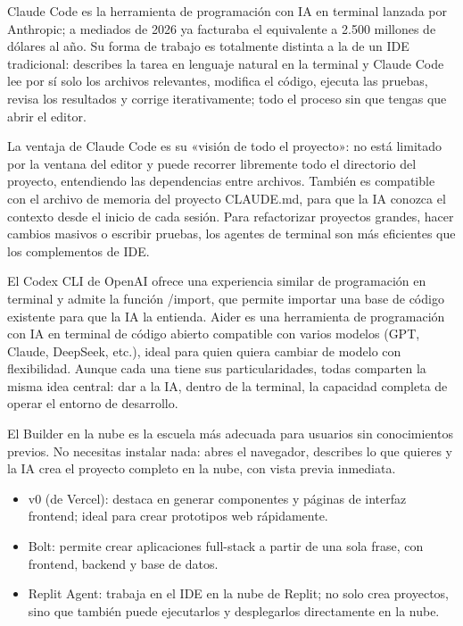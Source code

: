 
Claude Code es la herramienta de programación con IA en terminal lanzada por Anthropic; a mediados de 2026 ya facturaba el equivalente a 2.500 millones de dólares al año. Su forma de trabajo es totalmente distinta a la de un IDE tradicional: describes la tarea en lenguaje natural en la terminal y Claude Code lee por sí solo los archivos relevantes, modifica el código, ejecuta las pruebas, revisa los resultados y corrige iterativamente; todo el proceso sin que tengas que abrir el editor.

La ventaja de Claude Code es su «visión de todo el proyecto»: no está limitado por la ventana del editor y puede recorrer libremente todo el directorio del proyecto, entendiendo las dependencias entre archivos. También es compatible con el archivo de memoria del proyecto CLAUDE.md, para que la IA conozca el contexto desde el inicio de cada sesión. Para refactorizar proyectos grandes, hacer cambios masivos o escribir pruebas, los agentes de terminal son más eficientes que los complementos de IDE.


El Codex CLI de OpenAI ofrece una experiencia similar de programación en terminal y admite la función /import, que permite importar una base de código existente para que la IA la entienda. Aider es una herramienta de programación con IA en terminal de código abierto compatible con varios modelos (GPT, Claude, DeepSeek, etc.), ideal para quien quiera cambiar de modelo con flexibilidad. Aunque cada una tiene sus particularidades, todas comparten la misma idea central: dar a la IA, dentro de la terminal, la capacidad completa de operar el entorno de desarrollo.


El Builder en la nube es la escuela más adecuada para usuarios sin conocimientos previos. No necesitas instalar nada: abres el navegador, describes lo que quieres y la IA crea el proyecto completo en la nube, con vista previa inmediata.

\begin{itemize}
  \item v0 (de Vercel): destaca en generar componentes y páginas de interfaz frontend; ideal para crear prototipos web rápidamente.
  \item Bolt: permite crear aplicaciones full-stack a partir de una sola frase, con frontend, backend y base de datos.
  \item Replit Agent: trabaja en el IDE en la nube de Replit; no solo crea proyectos, sino que también puede ejecutarlos y desplegarlos directamente en la nube.
\end{itemize}

